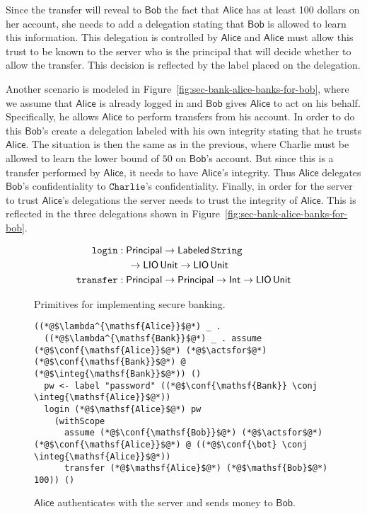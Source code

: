 Since the transfer will reveal to $\mathsf{Bob}$ the fact that $\mathsf{Alice}$ has at least 100 dollars on her account, she needs to add a delegation stating that $\mathsf{Bob}$ is allowed to learn this information. This delegation is controlled by $\mathsf{Alice}$ and $\mathsf{Alice}$ must allow this trust to be known to the server who is the principal that will decide whether to allow the transfer. This decision is reflected by the label placed on the delegation.

Another scenario is modeled in Figure~\ref{fig:sec-bank-alice-banks-for-bob}, where we assume that $\mathsf{Alice}$ is already logged in and $\mathsf{Bob}$ gives $\mathsf{Alice}$ to act on his behalf. Specifically, he allows $\mathsf{Alice}$ to perform transfers from his account. In order to do this $\mathsf{Bob}$'s create a delegation labeled with his own integrity stating that he trusts $\mathsf{Alice}$. The situation is then the same as in the previous, where Charlie must be allowed to learn the lower bound of $50$ on $\mathsf{Bob}$'s account. But since this is a transfer performed by $\mathsf{Alice}$, it needs to have $\mathsf{Alice}$'s integrity. Thus $\mathsf{Alice}$ delegates $\mathsf{Bob}$'s confidentiality to $\mathtt{Charlie}$'s confidentiality. Finally, in order for the server to trust $\mathsf{Alice}$'s delegations the server needs to trust the integrity of $\mathsf{Alice}$. This is reflected in the three delegations shown in Figure~\ref{fig:sec-bank-alice-banks-for-bob}.

\begin{figure}
    \centering
    \begin{align*}
\mathtt{login}&: \mathsf{Principal} \to \mathsf{Labeled}\,\mathtt{String} \\ &\quad \to \mathsf{LIO}\,\mathsf{Unit} \to \mathsf{LIO}\,\mathsf{Unit}\\
\mathtt{transfer}&: \mathsf{Principal} \to \mathsf{Principal} \to \mathsf{Int} \to \mathsf{LIO}\,\mathsf{Unit}
\end{align*}
    \caption{Primitives for implementing secure banking.}
    \label{fig:sec-banking-sigs}
\end{figure}

\begin{figure}
\centering
\begin{lstlisting}
((*@$\lambda^{\mathsf{Alice}}$@*) _ .
  ((*@$\lambda^{\mathsf{Bank}}$@*) _ . assume (*@$\conf{\mathsf{Alice}}$@*) (*@$\actsfor$@*) (*@$\conf{\mathsf{Bank}}$@*) @ (*@$\integ{\mathsf{Bank}}$@*)) ()
  pw <- label "password" ((*@$\conf{\mathsf{Bank}} \conj \integ{\mathsf{Alice}}$@*))
  login (*@$\mathsf{Alice}$@*) pw
    (withScope
      assume (*@$\conf{\mathsf{Bob}}$@*) (*@$\actsfor$@*) (*@$\conf{\mathsf{Alice}}$@*) @ ((*@$\conf{\bot} \conj \integ{\mathsf{Alice}}$@*))
      transfer (*@$\mathsf{Alice}$@*) (*@$\mathsf{Bob}$@*) 100)) ()
\end{lstlisting}
\caption{$\mathsf{Alice}$ authenticates with the server and sends money to $\mathsf{Bob}$.}
\label{fig:sec-bank-alice-send-to-bob}
\end{figure}

